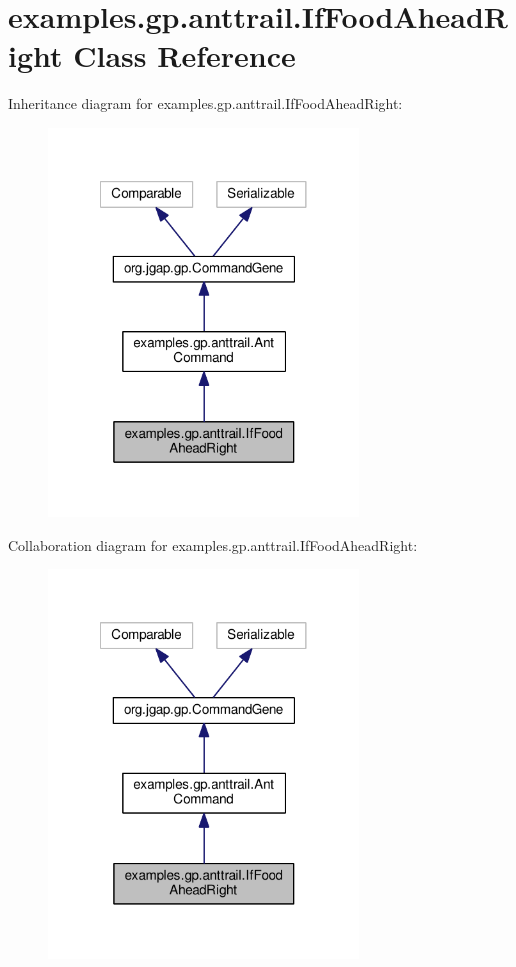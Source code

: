 \hypertarget{classexamples_1_1gp_1_1anttrail_1_1_if_food_ahead_right}{\section{examples.\-gp.\-anttrail.\-If\-Food\-Ahead\-Right Class Reference}
\label{classexamples_1_1gp_1_1anttrail_1_1_if_food_ahead_right}
}


Inheritance diagram for examples.\-gp.\-anttrail.\-If\-Food\-Ahead\-Right\-:
\nopagebreak
\begin{figure}[H]
\begin{center}
\leavevmode
\includegraphics[width=233pt]{classexamples_1_1gp_1_1anttrail_1_1_if_food_ahead_right__inherit__graph}
\end{center}
\end{figure}


Collaboration diagram for examples.\-gp.\-anttrail.\-If\-Food\-Ahead\-Right\-:
\nopagebreak
\begin{figure}[H]
\begin{center}
\leavevmode
\includegraphics[width=233pt]{classexamples_1_1gp_1_1anttrail_1_1_if_food_ahead_right__coll__graph}
\end{center}
\end{figure}

